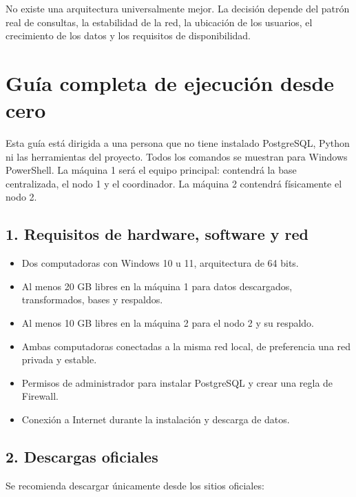 \documentclass[12pt,letterpaper]{article}
\begin{document}
No existe una arquitectura universalmente mejor. La decisión depende del
patrón real de consultas, la estabilidad de la red, la ubicación de los
usuarios, el crecimiento de los datos y los requisitos de disponibilidad.

\section{Guía completa de ejecución desde cero}

Esta guía está dirigida a una persona que no tiene instalado PostgreSQL,
Python ni las herramientas del proyecto. Todos los comandos se muestran para
Windows PowerShell. La máquina 1 será el equipo principal: contendrá la base
centralizada, el nodo 1 y el coordinador. La máquina 2 contendrá físicamente el
nodo 2.

\subsection{1. Requisitos de hardware, software y red}

\begin{itemize}
  \item Dos computadoras con Windows 10 u 11, arquitectura de 64 bits.
  \item Al menos 20 GB libres en la máquina 1 para datos descargados,
        transformados, bases y respaldos.
  \item Al menos 10 GB libres en la máquina 2 para el nodo 2 y su respaldo.
  \item Ambas computadoras conectadas a la misma red local, de preferencia una
        red privada y estable.
  \item Permisos de administrador para instalar PostgreSQL y crear una regla
        de Firewall.
  \item Conexión a Internet durante la instalación y descarga de datos.
\end{itemize}

\subsection{2. Descargas oficiales}

Se recomienda descargar únicamente desde los sitios oficiales:
\end{document}
